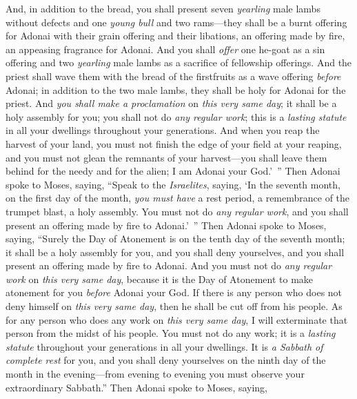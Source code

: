 \begin{biblechapter}
\verse And, in addition to the bread, you shall present seven \textit{yearling} male lambs without defects and one \textit{young bull} and two rams—they shall be a burnt offering for Adonai with their grain offering and their libations, an offering made by fire, an appeasing fragrance for Adonai.
\verse And you shall \textit{offer} one he-goat as a sin offering and two \textit{yearling} male lambs as a sacrifice of fellowship offerings.
\verse And the priest shall wave them with the bread of the firstfruits as a wave offering \textit{before} Adonai; in addition to the two male lambs, they shall be holy for Adonai for the priest.
\verse And \textit{you shall make a proclamation} on \textit{this very same day}; it shall be a holy assembly for you; you shall not do \textit{any regular work}; this is a \textit{lasting statute} in all your dwellings throughout your generations.
\verse And when you reap the harvest of your land, you must not finish the edge of your field at your reaping, and you must not glean the remnants of your harvest—you shall leave them behind for the needy and for the alien; I am Adonai your God.’ ”
 Then Adonai spoke to Moses, saying,
\verse “Speak to the \textit{Israelites}, saying, ‘In the seventh month, on the first day of the month, \textit{you must have} a rest period, a remembrance of the trumpet blast, a holy assembly.
\verse You must not do \textit{any regular work}, and you shall present an offering made by fire to Adonai.’ ”
 Then Adonai spoke to Moses, saying,
\verse “Surely the Day of Atonement is on the tenth day of the seventh month; it shall be a holy assembly for you, and you shall deny yourselves, and you shall present an offering made by fire to Adonai.
\verse And you must not do \textit{any regular work} on \textit{this very same day}, because it is the Day of Atonement to make atonement for you \textit{before} Adonai your God.
\verse If there is any person who does not deny himself on \textit{this very same day}, then he shall be cut off from his people.
\verse As for any person who does any work on \textit{this very same day}, I will exterminate that person from the midst of his people.
\verse You must not do any work; it is a \textit{lasting statute} throughout your generations in all your dwellings.
\verse It is \textit{a Sabbath of complete rest} for you, and you shall deny yourselves on the ninth day of the month in the evening—from evening to evening you must observe your extraordinary Sabbath.”
 Then Adonai spoke to Moses, saying,

\end{biblechapter}
